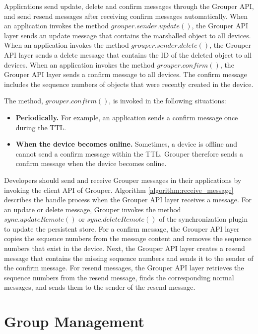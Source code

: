 \documentclass[a4paper,11pt]{report}
\begin{document}
Applications send update, delete and confirm messages through the Grouper API, and send resend messages after receiving confirm messages automatically.
When an application invokes the method $grouper.sender.update()$, the Grouper API layer sends an update message that contains the marshalled object to all devices.
When an application invokes the method $grouper.sender.delete()$, the Grouper API layer sends a delete message that contains the ID of the deleted object to all devices. 
When an application invokes the method $grouper.confirm()$, the Grouper API layer sends a confirm message to all devices. 
The confirm message includes the sequence numbers of objects that were recently created in the device.

The method, $grouper.confirm()$, is invoked in the following situations:

\begin{itemize}[leftmargin=7mm]
	\setlength{\itemsep}{1pt}
	\setlength{\parskip}{0pt}
	\setlength{\parsep}{0pt}
	\item \textbf{Periodically.}
	For example, an application sends a confirm message once during the TTL.
	\item \textbf{When the device becomes online.} 
	Sometimes, a device is offline and cannot send a confirm message within the TTL.
	Grouper therefore sends a confirm message when the device becomes online.
\end{itemize}

Developers should send and receive Grouper messages in their applications by invoking the client API of Grouper.
Algorithm \ref{algorithm:receive_message} describes the handle process when the Grouper API layer receives a message.
For an update or delete message, Grouper invokes the method $sync.updateRemote()$ or $sync.deleteRemote()$ of the synchronization plugin to update the persistent store.
For a confirm message, the Grouper API layer copies the sequence numbers from the message content and removes the sequence numbers that exist in the device.
Next, the Grouper API layer creates a resend message that contains the missing sequence numbers and sends it to the sender of the confirm message.
For resend messages, the Grouper API layer retrieves the sequence numbers from the resend message, finds the corresponding normal messages, and sends them to the sender of the resend message.

\section{Group Management}  \label{section:group_management}
\end{document}
